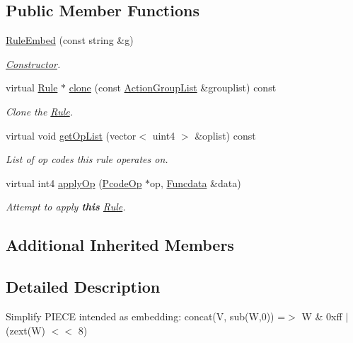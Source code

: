 \subsection*{Public Member Functions}
\begin{DoxyCompactItemize}
\item 
\mbox{\hyperlink{class_rule_embed_afb7802037e5e0905421d5da62e80e187}{Rule\+Embed}} (const string \&g)
\begin{DoxyCompactList}\small\item\em \mbox{\hyperlink{class_constructor}{Constructor}}. \end{DoxyCompactList}\item 
virtual \mbox{\hyperlink{class_rule}{Rule}} $\ast$ \mbox{\hyperlink{class_rule_embed_a665557b4d2e8b6dead6e209a819ea134}{clone}} (const \mbox{\hyperlink{class_action_group_list}{Action\+Group\+List}} \&grouplist) const
\begin{DoxyCompactList}\small\item\em Clone the \mbox{\hyperlink{class_rule}{Rule}}. \end{DoxyCompactList}\item 
virtual void \mbox{\hyperlink{class_rule_embed_a3fd9cd36368a20aa7fd4d6b5c9b06ad2}{get\+Op\+List}} (vector$<$ uint4 $>$ \&oplist) const
\begin{DoxyCompactList}\small\item\em List of op codes this rule operates on. \end{DoxyCompactList}\item 
virtual int4 \mbox{\hyperlink{class_rule_embed_abd0eb20956c404ec4abcb2776c593086}{apply\+Op}} (\mbox{\hyperlink{class_pcode_op}{Pcode\+Op}} $\ast$op, \mbox{\hyperlink{class_funcdata}{Funcdata}} \&data)
\begin{DoxyCompactList}\small\item\em Attempt to apply {\bfseries{this}} \mbox{\hyperlink{class_rule}{Rule}}. \end{DoxyCompactList}\end{DoxyCompactItemize}
\subsection*{Additional Inherited Members}


\subsection{Detailed Description}
Simplify P\+I\+E\+CE intended as embedding\+: {\ttfamily concat(\+V, sub(\+W,0)) =$>$ W \& 0xff $\vert$ (zext(\+W) $<$$<$ 8)} 

